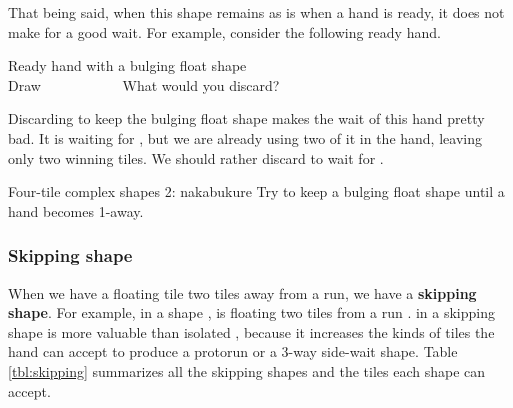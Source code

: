 \bigskip
That being said, when this shape remains as is when a hand is ready, it does not make for a good wait. For example, consider the following ready hand. 
\begin{itembox}[r]{Ready hand with a bulging float shape}
\bp
{}\bei\zhong\zhong\zhong~\\
\hfill\footnotesize{Draw~~~~~~~~~~~}
\ep 
\vspace{-15pt}What would you discard? \vspace{-5pt}
\end{itembox}
\noindent
Discarding {\LARGE\bei} to keep the bulging float shape {\LARGE{}} makes the wait of this hand pretty bad. It is waiting for {\LARGE{}}, but we are already using two of it in the hand, leaving only two winning tiles. We should rather discard {\LARGE{}} to wait for {\LARGE\bei}. 

\vfill
\color{MyRed}
\begin{itembox}[c]{Four-tile complex shapes 2: {\jap nakabukure}}
\normalcolor
Try to keep a bulging float shape until a hand becomes 1-away.
\end{itembox}\normalcolor

\subsubsection{Skipping shape}
When we have a floating tile two tiles away from a run, we have a {\bf skipping shape}. For example, in a shape {\LARGE{}}, {\LARGE{}} is floating two tiles from a run {\LARGE{}}. {\LARGE{}} in a skipping shape is more valuable than isolated {\LARGE{}}, because it increases the kinds of tiles the hand can accept to produce a protorun or a 3-way side-wait shape. Table \ref{tbl:skipping} summarizes all the skipping shapes and the tiles each shape can accept. 

